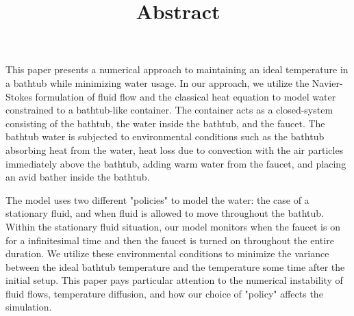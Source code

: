 \documentclass[10pt]{article}
\title{Abstract}
\begin{document}
\maketitle

This paper presents a numerical approach to maintaining an ideal temperature in a bathtub while minimizing water usage. In our approach, we utilize the Navier-Stokes formulation of fluid flow and the classical heat equation to model water constrained to a bathtub-like container. The container acts as a closed-system consisting of the bathtub, the water inside the bathtub, and the faucet. The bathtub water is subjected to environmental conditions such as the bathtub absorbing heat from the water, heat loss due to convection with the air particles immediately above the bathtub, adding warm water from the faucet, and placing an avid bather inside the bathtub.

The model uses two different "policies" to model the water: the case of a stationary fluid, and when fluid is allowed to move throughout the bathtub. Within the stationary fluid situation, our model monitors when the faucet is on for a infinitesimal time and then the faucet is turned on throughout the entire duration. We utilize these environmental conditions to minimize the variance between the ideal bathtub temperature and the temperature some time after the initial setup. This paper pays particular attention to the numerical instability of fluid flows, temperature diffusion, and how our choice of "policy" affects the simulation.
\end{document}
